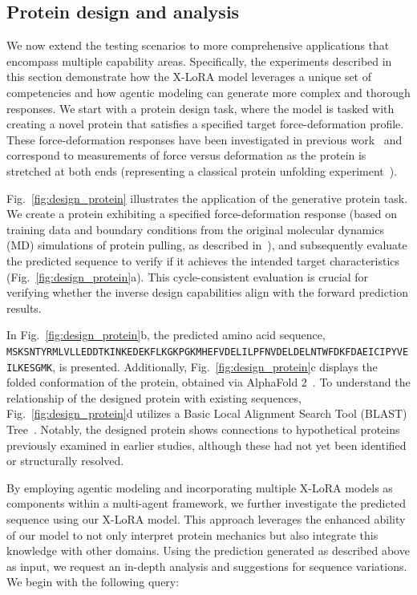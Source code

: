 \subsection{Protein design and analysis}

We now extend the testing scenarios to more comprehensive applications that encompass multiple capability areas. Specifically, the experiments described in this section demonstrate how the X-LoRA model leverages a unique set of competencies and how agentic modeling can generate more complex and thorough responses. We start with a protein design task, where the model is tasked with creating a novel protein that satisfies a specified target force-deformation profile. These force-deformation responses have been investigated in previous work~\cite{Ni2023ForceGen:Model} and correspond to measurements of force versus deformation as the protein is stretched at both ends (representing a classical protein unfolding experiment~\cite{Lu1998UnfoldingSimulation.}).

Fig.~\ref{fig:design_protein} illustrates the application of the generative protein task. We create a protein exhibiting a specified force-deformation response (based on training data and boundary conditions from the original molecular dynamics (MD) simulations of protein pulling, as described in~\cite{Ni2023ForceGen:Model}), and subsequently evaluate the predicted sequence to verify if it achieves the intended target characteristics (Fig.~\ref{fig:design_protein}a). This cycle-consistent evaluation is crucial for verifying whether the inverse design capabilities align with the forward prediction results.

In Fig.~\ref{fig:design_protein}b, the predicted amino acid sequence, \texttt{MSKSNTYRMLVLLEDDTKINKEDEKFLKGKPGKMHEFVDELILPFNVDELDELNTWFDKFDAEICIPYVEILKESGMK}, is presented. Additionally, Fig.~\ref{fig:design_protein}c displays the folded conformation of the protein, obtained via AlphaFold 2~\cite{Jumper2021HighlyAlphaFoldb}. To understand the relationship of the designed protein with existing sequences, Fig.~\ref{fig:design_protein}d utilizes a Basic Local Alignment Search Tool (BLAST) Tree~\cite{Altschul1990BasicTool}. Notably, the designed protein shows connections to hypothetical proteins previously examined in earlier studies, although these had not yet been identified or structurally resolved.

By employing agentic modeling and incorporating multiple X-LoRA models as components within a multi-agent framework, we further investigate the predicted sequence using our X-LoRA model. This approach leverages the enhanced ability of our model to not only interpret protein mechanics but also integrate this knowledge with other domains. Using the prediction generated as described above as input, we request an in-depth analysis and suggestions for sequence variations. We begin with the following query:

